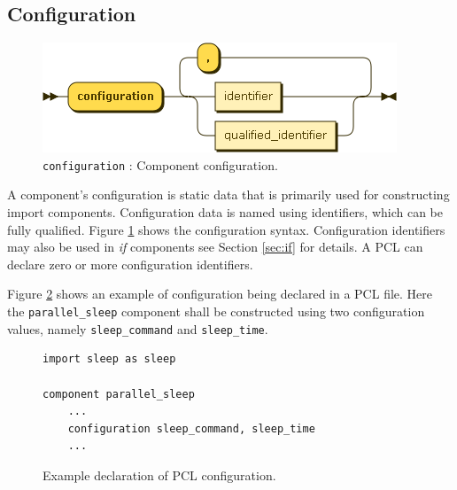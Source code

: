 \subsection{Configuration}
\begin{figure}[h!]
  \centering
    \includegraphics[scale=\DiagramScale]{chapters/compiler/diagrams/configuration}
  \caption{\texttt{configuration} : Component configuration.}
  \label{fig:pcl-config}
\end{figure}
A component's configuration is static data that is primarily used for constructing import components. Configuration data is named using identifiers, which can be fully qualified. Figure \ref{fig:pcl-config} shows the configuration syntax. Configuration identifiers may also be used in \emph{if} components see Section \ref{sec:if} for details. A PCL can declare zero or more configuration identifiers.

Figure \ref{fig:pcl-config-example} shows an example of configuration being declared in a PCL file. Here the \texttt{parallel\_sleep} component shall be constructed using two configuration values, namely \texttt{sleep\_command} and \texttt{sleep\_time}.
\begin{figure}[h!]
\begin{center}
\begin{verbatim}
import sleep as sleep

component parallel_sleep
    ...
    configuration sleep_command, sleep_time
    ...
\end{verbatim}
\end{center}
\caption{Example declaration of PCL configuration.}
\label{fig:pcl-config-example}
\end{figure}

